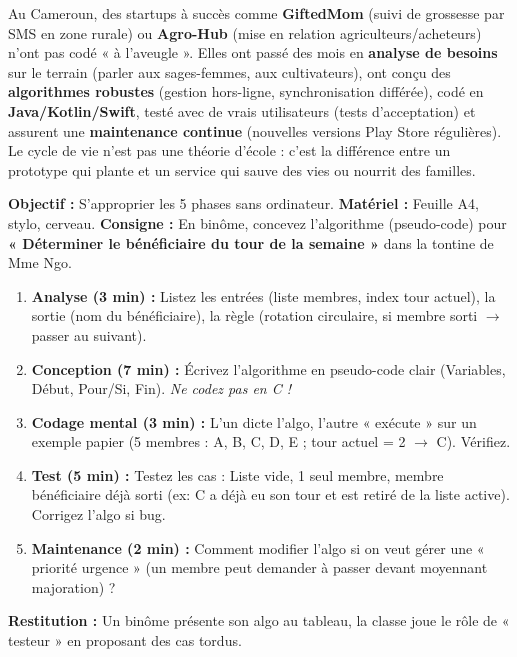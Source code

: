 \documentclass[11pt]{article}
\begin{document}
\begin{savaistu}
Au Cameroun, des startups à succès comme \textbf{GiftedMom} (suivi de grossesse par SMS en zone rurale) ou \textbf{Agro-Hub} (mise en relation agriculteurs/acheteurs) n'ont pas codé « à l'aveugle ». Elles ont passé des mois en \textbf{analyse de besoins} sur le terrain (parler aux sages-femmes, aux cultivateurs), ont conçu des \textbf{algorithmes robustes} (gestion hors-ligne, synchronisation différée), codé en \textbf{Java/Kotlin/Swift}, testé avec de vrais utilisateurs (tests d'acceptation) et assurent une \textbf{maintenance continue} (nouvelles versions Play Store régulières). Le cycle de vie n'est pas une théorie d'école : c'est la différence entre un prototype qui plante et un service qui sauve des vies ou nourrit des familles.
\end{savaistu}

\begin{experience}
\textbf{Objectif :} S'approprier les 5 phases sans ordinateur.
\textbf{Matériel :} Feuille A4, stylo, cerveau.
\textbf{Consigne :} En binôme, concevez l'algorithme (pseudo-code) pour \textbf{« Déterminer le bénéficiaire du tour de la semaine »} dans la tontine de Mme Ngo.
\begin{enumerate}
    \item \textbf{Analyse (3 min) :} Listez les entrées (liste membres, index tour actuel), la sortie (nom du bénéficiaire), la règle (rotation circulaire, si membre sorti $\rightarrow$ passer au suivant).
    \item \textbf{Conception (7 min) :} Écrivez l'algorithme en pseudo-code clair (Variables, Début, Pour/Si, Fin). \emph{Ne codez pas en C !}
    \item \textbf{Codage mental (3 min) :} L'un dicte l'algo, l'autre « exécute » sur un exemple papier (5 membres : A, B, C, D, E ; tour actuel = 2 $\rightarrow$ C). Vérifiez.
    \item \textbf{Test (5 min) :} Testez les cas : Liste vide, 1 seul membre, membre bénéficiaire déjà sorti (ex: C a déjà eu son tour et est retiré de la liste active). Corrigez l'algo si bug.
    \item \textbf{Maintenance (2 min) :} Comment modifier l'algo si on veut gérer une « priorité urgence » (un membre peut demander à passer devant moyennant majoration) ?
\end{enumerate}
\textbf{Restitution :} Un binôme présente son algo au tableau, la classe joue le rôle de « testeur » en proposant des cas tordus.
\end{experience}
\end{document}
